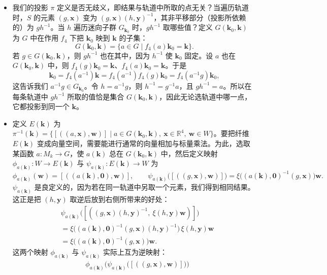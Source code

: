 \begin{itemize}
\[\]
这使 $E$ 成为 $M_k$ 之上的一个丛。
\item 我们的投影 $\pi$ 定义是否无歧义，即结果与轨道中所取的点无关？当遍历轨道时，$S$ 的元素 $(g,\mathbf{x})$ 变为 $(g,\mathbf{x})(h,\mathbf{y})^{-1}$，其非平移部分（投影所依赖的）为 $gh^{-1}$。当 $h$ 遍历迷向子群 $G_{\mathbf{k}_0}$ 时，$gh^{-1}$ 取哪些值？定义 $G(\mathbf{k}_0,\mathbf{k})$ 为 $G$ 中在作用 $f_4$ 下把 $\mathbf{k}_0$ 映到 $\mathbf{k}$ 的子集：
\[
G(\mathbf{k}_0,\mathbf{k})=\{a\in G\mid f_4(a)\mathbf{k}_0=\mathbf{k}\}.
\]
若 $g\in G(\mathbf{k}_0,\mathbf{k})$，则 $gh^{-1}$ 也在其中，因为 $h^{-1}$ 使 $\mathbf{k}_0$ 固定。设 $a$ 也在 $G(\mathbf{k}_0,\mathbf{k})$ 中，则 $f_4(g)\mathbf{k}_0=\mathbf{k}$、$f_4(a)\mathbf{k}_0=\mathbf{k}$。于是
\[
\mathbf{k}_0=f_4(a^{-1})\mathbf{k}=f_4(a^{-1})f_4(g)\mathbf{k}_0=f_4(a^{-1}g)\mathbf{k}_0,
\]
这告诉我们 $a^{-1}g\in G_{\mathbf{k}_0}$。令 $h=a^{-1}g$，则 $h^{-1}=g^{-1}a$，且 $gh^{-1}=a$。所以在每条轨道中 $gh^{-1}$ 所取的值恰是集合 $G(\mathbf{k}_0,\mathbf{k})$，因此无论选轨道中哪一点，它都投影到同一个 $\mathbf{k}$。
\item 定义 $E(\mathbf{k})$ 为 $\pi^{-1}(\mathbf{k})=\{[((a,\mathbf{x}),\mathbf{w})]\mid a\in G(\mathbf{k}_0,\mathbf{k}),\ \mathbf{x}\in\mathbb{R}^4,\ \mathbf{w}\in W\}$。要把纤维 $E(\mathbf{k})$ 变成向量空间，需要能进行通常的向量相加与标量乘法。为此，选取某函数 $a:M_k\to G$，使 $a(\mathbf{k})$ 总在 $G(\mathbf{k}_0,\mathbf{k})$ 中，然后定义映射 $\phi_{a(\mathbf{k})}:W\to E(\mathbf{k})$ 与 $\psi_{a(\mathbf{k})}:E(\mathbf{k})\to W$ 为
\[
\phi_{a(\mathbf{k})}(\mathbf{w})=[((a(\mathbf{k}),\mathbf{0}),\mathbf{w})],\qquad
\psi_{a(\mathbf{k})}\big([((g,\mathbf{x}),\mathbf{w})]\big)=\xi\big((a(\mathbf{k}),\mathbf{0})^{-1}(g,\mathbf{x})\big)\mathbf{w}.
\]
$\psi_{a(\mathbf{k})}$ 是良定义的，因为若在同一轨道中另取一个元素，我们得到相同结果。这正是把 $(h,\mathbf{y})$ 取逆后放到右侧所带来的好处：
\begin{align*}
&\psi_{a(\mathbf{k})}\big([((g,\mathbf{x})(h,\mathbf{y})^{-1},\ \xi(h,\mathbf{y})\mathbf{w})]\big)\\
&=\xi\big((a(\mathbf{k}),\mathbf{0})^{-1}(g,\mathbf{x})(h,\mathbf{y})^{-1}\big)\,\xi(h,\mathbf{y})\mathbf{w}\\
&=\xi\big((a(\mathbf{k}),\mathbf{0})^{-1}(g,\mathbf{x})\big)\mathbf{w}.
\end{align*}
这两个映射 $\phi_{a(\mathbf{k})}$ 与 $\psi_{a(\mathbf{k})}$ 实际上互为逆映射：
\begin{align*}
&\phi_{a(\mathbf{k})}\Big(\psi_{a(\mathbf{k})}\big([((g,\mathbf{x}),\mathbf{w})]\big)\Big)\\

\end{align*}
\end{itemize}
